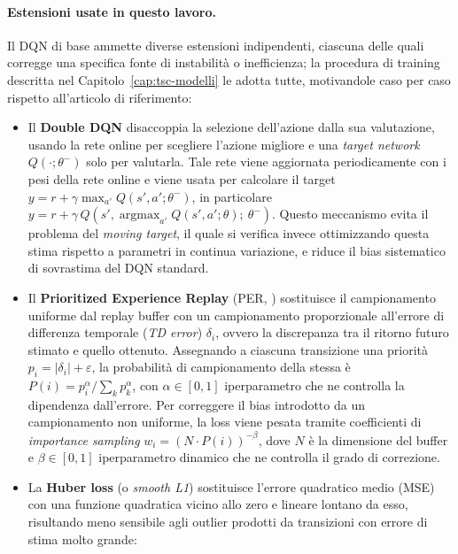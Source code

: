 \paragraph{Estensioni usate in questo lavoro.} Il DQN di base ammette diverse
estensioni indipendenti, ciascuna delle quali corregge una specifica fonte di
instabilità o inefficienza; la procedura di training descritta nel
Capitolo~\ref{cap:tsc-modelli} le adotta tutte, motivandole caso per caso
rispetto all'articolo di riferimento:
\begin{itemize}
  \item Il \textbf{Double DQN} \citep{vanhasselt2016double} disaccoppia la
    selezione dell'azione dalla sua valutazione, usando la rete online per
    scegliere l'azione migliore e una \emph{target network} $Q(\cdot;\theta^-)$ solo per valutarla.
    Tale rete viene aggiornata periodicamente con i pesi della rete online e viene 
    usata per calcolare il target $y = r + \gamma \max_{a'} Q(s',a';\theta^-)$, in particolare  
    $y = r + \gamma\, Q\!\left(s', \operatorname*{argmax}_{a'} Q(s',a';\theta);\ \theta^-\right)$.
    Questo meccanismo evita il problema del \emph{moving target}, il quale si verifica invece ottimizzando questa stima rispetto 
    a parametri in continua variazione, e riduce il bias sistematico di sovrastima del DQN standard.
  \item Il \textbf{Prioritized Experience Replay} (PER,
    \citealp{schaul2016per}) sostituisce il campionamento uniforme dal
    replay buffer con un campionamento proporzionale all'errore di
    differenza temporale (\emph{TD error}) $\delta_i$, ovvero la discrepanza tra
    il ritorno futuro stimato e quello ottenuto. Assegnando a ciascuna transizione una priorità
    $p_i = |\delta_i| + \varepsilon$, la probabilità di campionamento della stessa è
    $P(i) = p_i^\alpha / \sum_k p_k^\alpha$, con $\alpha \in [0,1]$ iperparametro che ne controlla la dipendenza dall'errore. Per correggere il bias
    introdotto da un campionamento non uniforme, la loss viene pesata tramite coefficienti di \emph{importance sampling} 
    $w_i = \left(N \cdot P(i)\right)^{-\beta}$, dove $N$ è la dimensione del buffer e $\beta \in [0,1]$ iperparametro dinamico che ne controlla il grado di correzione.
  \item La \textbf{Huber loss} (o \emph{smooth L1}) sostituisce l'errore
    quadratico medio (MSE) con una funzione quadratica vicino allo zero e lineare
    lontano da esso, risultando meno sensibile agli outlier prodotti da transizioni con
    errore di stima molto grande:

\end{itemize}
